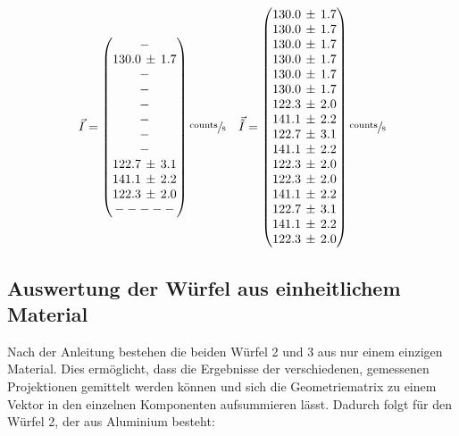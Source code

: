 \begin{equation}
	\vec{I}=
	\begin{pmatrix}
		- \\
		130.0\,\pm\,1.7 \\
		- \\
		- \\
	  - \\
		- \\
		- \\
		- \\
		122.7\,\pm\,3.1 \\
		141.1\,\pm\,2.2 \\
		122.3\,\pm\,2.0 \\
		-
    -
    -
    -
    -
	\end{pmatrix}
	\sfrac{\text{counts}}{\text{s}}\quad
	\vec{\tilde{I}}=
	\begin{pmatrix}
		130.0\,\pm\,1.7 \\
		130.0\,\pm\,1.7 \\
		130.0\,\pm\,1.7 \\
		130.0\,\pm\,1.7 \\
		130.0\,\pm\,1.7 \\
		130.0\,\pm\,1.7 \\
		122.3\,\pm\,2.0 \\
		141.1\,\pm\,2.2 \\
		122.7\,\pm\,3.1 \\
		141.1\,\pm\,2.2 \\
		122.3\,\pm\,2.0 \\
		122.3\,\pm\,2.0 \\
    141.1\,\pm\,2.2 \\
    122.7\,\pm\,3.1 \\
    141.1\,\pm\,2.2 \\
    122.3\,\pm\,2.0 \\
	\end{pmatrix}
    \sfrac{\text{counts}}{\text{s}}
	\label{eq:int}
\end{equation}

\subsection{Auswertung der Würfel aus einheitlichem Material}

Nach der Anleitung bestehen die beiden Würfel 2 und 3 aus nur einem einzigen Material. Dies ermöglicht, dass die Ergebnisse der verschiedenen, gemessenen Projektionen gemittelt werden können und sich die Geometriematrix zu einem Vektor in den einzelnen Komponenten aufsummieren lässt.
Dadurch folgt für den Würfel 2, der aus Aluminium besteht:

